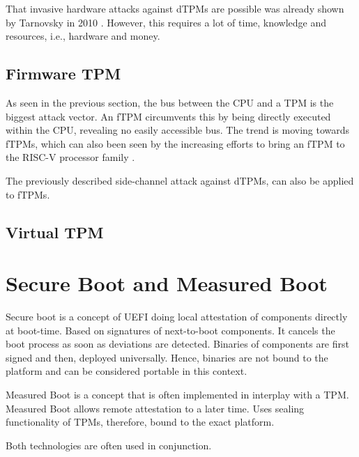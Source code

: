That invasive hardware attacks against dTPMs are possible was already shown by Tarnovsky in 2010 \cite{tarnovsky}. However, this requires a lot of time, knowledge and resources, i.e., hardware and money.


\subsection{Firmware TPM}


As seen in the previous section, the bus between the CPU and a TPM is the biggest attack vector. An fTPM circumvents this by being directly executed within the CPU, revealing no easily accessible bus.
The trend is moving towards fTPMs, which can also been seen by the increasing efforts to bring an fTPM to the RISC-V processor family \cite{Boubakri2021}.

The previously described side-channel attack \cite{Moghimi2019} against dTPMs, can also be applied to fTPMs.

\subsection{Virtual TPM}




\section{Secure Boot and Measured Boot}

Secure boot is a concept of UEFI doing local attestation of components directly at boot-time. Based on signatures of next-to-boot components. It cancels the boot process as soon as deviations are detected. Binaries of components are first signed and then, deployed universally. Hence, binaries are not bound to the platform and can be considered portable in this context.

Measured Boot is a concept that is often implemented in interplay with a TPM. Measured Boot allows remote attestation to a later time. Uses sealing functionality of TPMs, therefore, bound to the exact platform.

Both technologies are often used in conjunction.
